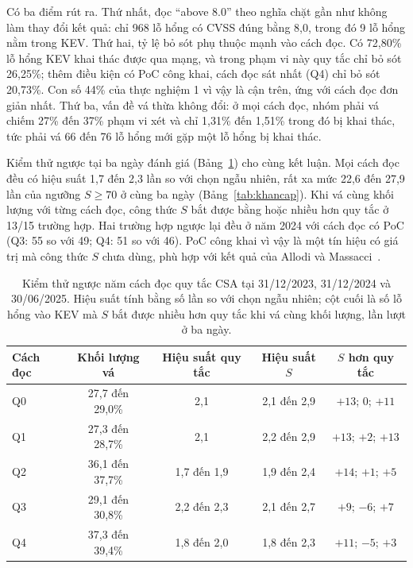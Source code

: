 \documentclass[runningheads]{llncs}
\begin{document}
Có ba điểm rút ra. Thứ nhất, đọc ``above 8.0'' theo nghĩa chặt gần như không làm thay đổi kết quả: chỉ
968 lỗ hổng có CVSS đúng bằng 8,0, trong đó 9 lỗ hổng nằm trong KEV. Thứ hai, tỷ lệ bỏ sót phụ
thuộc mạnh vào cách đọc. Có 72,80\% lỗ hổng KEV khai thác được qua mạng, và trong phạm vi này quy tắc
chỉ bỏ sót 26,25\%; thêm điều kiện có PoC công khai, cách đọc sát nhất (Q4) chỉ bỏ sót 20,73\%.
Con số 44\% của thực nghiệm 1 vì vậy là cận trên, ứng với cách đọc đơn giản nhất. Thứ ba, vấn đề
vá thừa không đổi: ở mọi cách đọc, nhóm phải vá chiếm 27\% đến 37\% phạm vi xét và chỉ 1,31\% đến 1,51\%
trong đó bị khai thác, tức phải vá 66 đến 76 lỗ hổng mới gặp một lỗ hổng bị khai thác.

Kiểm thử ngược tại ba ngày đánh giá (Bảng~\ref{tab:donhay2}) cho cùng kết luận. Mọi cách đọc đều
có hiệu suất 1,7 đến 2,3 lần so với chọn ngẫu nhiên, rất xa mức 22,6 đến 27,9 lần của ngưỡng $S \ge 70$ ở cùng
ba ngày (Bảng~\ref{tab:khancap}). Khi vá cùng khối lượng với từng cách đọc, công thức $S$ bắt được
bằng hoặc nhiều hơn quy tắc ở 13/15 trường hợp. Hai trường hợp ngược lại đều ở năm 2024 với cách
đọc có PoC (Q3: 55 so với 49; Q4: 51 so với 46). PoC công khai vì vậy là một tín hiệu có giá trị
mà công thức $S$ chưa dùng, phù hợp với kết quả của Allodi và Massacci~\cite{allodi2014}.

\begin{table}
\centering
\setlength{\tabcolsep}{5pt}
\caption{Kiểm thử ngược năm cách đọc quy tắc CSA tại 31/12/2023, 31/12/2024 và 30/06/2025. Hiệu
suất tính bằng số lần so với chọn ngẫu nhiên; cột cuối là số lỗ hổng vào KEV mà $S$ bắt được
nhiều hơn quy tắc khi vá cùng khối lượng, lần lượt ở ba ngày.}\label{tab:donhay2}
\begin{tabular}{lcccc}
\toprule
Cách đọc & Khối lượng vá & Hiệu suất quy tắc & Hiệu suất $S$ & $S$ hơn quy tắc \\
\midrule
Q0 & 27,7 đến 29,0\% & 2,1 & 2,1 đến 2,9 & $+13$; $0$; $+11$ \\
Q1 & 27,3 đến 28,7\% & 2,1 & 2,2 đến 2,9 & $+13$; $+2$; $+13$ \\
Q2 & 36,1 đến 37,7\% & 1,7 đến 1,9 & 1,9 đến 2,4 & $+14$; $+1$; $+5$ \\
Q3 & 29,1 đến 30,8\% & 2,2 đến 2,3 & 2,1 đến 2,7 & $+9$; $-6$; $+7$ \\
Q4 & 37,3 đến 39,4\% & 1,8 đến 2,0 & 1,8 đến 2,3 & $+11$; $-5$; $+3$ \\
\bottomrule
\end{tabular}
\end{table}
\end{document}
